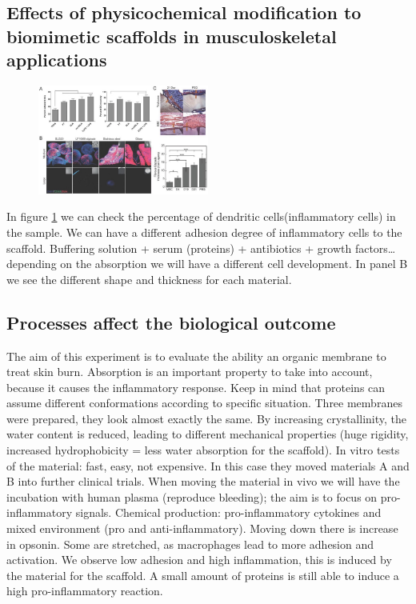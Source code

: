 \subsection{Effects of physicochemical modification to biomimetic scaffolds in musculoskeletal applications}
\begin{figure}[ht]
\centering
\includegraphics[width=0.5\textwidth]{muscosk}
\caption{\label{fig:muscosk}}
\end{figure}
\noindent
In figure \ref{fig:muscosk} we can check the percentage of dendritic cells(inflammatory cells) in the sample.
We can have a different adhesion degree of inflammatory cells to the scaffold.
Buffering solution + serum (proteins) + antibiotics + growth factors…depending on the absorption we will have a different cell development.
In panel B we see the different shape and thickness for each material.

\subsection{Processes affect the biological outcome}
The aim of this experiment is to evaluate the ability an organic membrane to treat skin burn. Absorption is an important property to take into account, because it causes the inflammatory response.
Keep in mind that proteins can assume different conformations according to specific situation. Three membranes were prepared, they look almost exactly the same.
By increasing crystallinity, the water content is reduced,  leading to different mechanical properties (huge rigidity, increased hydrophobicity = less water absorption for the scaffold).
In vitro tests of the material: fast, easy, not expensive.
In this case they moved materials A and B into further clinical trials. When moving the material in vivo we will have the incubation with human plasma (reproduce bleeding); the aim is to focus on pro-inflammatory signals.
Chemical production: pro-inflammatory cytokines and mixed environment (pro and anti-inflammatory). Moving down there is increase in opsonin.  Some are stretched, as macrophages lead to more adhesion and activation.
We observe low adhesion and high inflammation, this is induced by the material for the scaffold. A small amount of proteins is still able to induce a high pro-inflammatory reaction.

